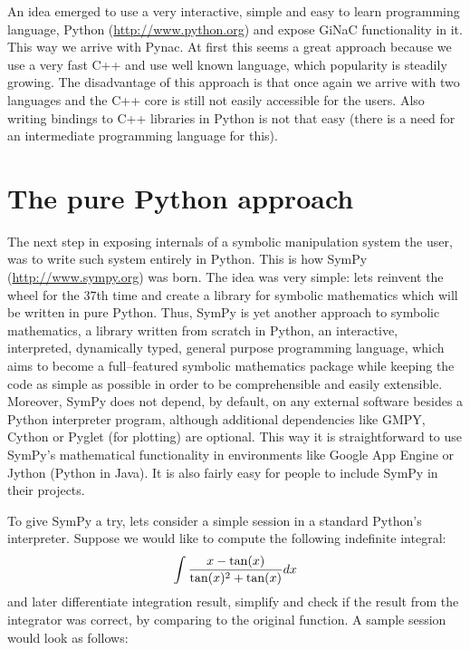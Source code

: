 An idea emerged to use a very interactive, simple and easy to learn programming language,
Python (\href{http://www.python.org}{http://www.python.org}) and expose GiNaC functionality in it. This way we arrive
with Pynac. At first this seems a great approach because we use a very fast C++ and use
well known language, which popularity is steadily growing. The disadvantage of this approach
is that once again we arrive with two languages and the C++ core is still not easily accessible
for the users. Also writing bindings to C++ libraries in Python is not that easy (there is a
need for an intermediate programming language for this).


\section{The pure Python approach}

The next step in exposing internals of a symbolic manipulation system the user, was to
write such system entirely in Python. This is how SymPy (\href{http://www.sympy.org}{http://www.sympy.org}) was born.
The idea was very simple: lets reinvent the wheel for the 37th time and create a library
for symbolic mathematics which will be written in pure Python. Thus, SymPy is yet another
approach to symbolic mathematics, a library written from scratch in Python, an interactive,
interpreted, dynamically typed, general purpose programming language, which aims to become
a full--featured symbolic mathematics package while keeping the code as simple as possible
in order to be comprehensible and easily extensible. Moreover, SymPy does not depend, by
default, on any external software besides a Python interpreter program, although additional
dependencies like GMPY, Cython or Pyglet (for plotting) are optional. This way it is
straightforward to use SymPy's mathematical functionality in environments like Google App
Engine or Jython (Python in Java). It is also fairly easy for people to include SymPy in
their projects.

To give SymPy a try, lets consider a simple session in a standard Python's interpreter.
Suppose we would like to compute the following indefinite integral:
\begin{gather}
\begin{split}\int \frac{x - \tan(x)}{\tan(x)^2 + \tan(x)} dx\end{split}\notag
\end{gather}
and later differentiate integration result, simplify and check if the result from the
integrator was correct, by comparing to the original function. A sample session would
look as follows:

